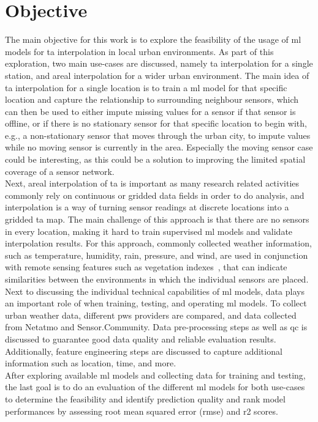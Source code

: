\section{Objective}

The main objective for this work is to explore the feasibility of the usage of \gls{ml} models for \gls{ta} interpolation in local urban environments. As part of this exploration, two main use-cases are discussed, namely \gls{ta} interpolation for a single station, and areal interpolation for a wider urban environment. The main idea of \gls{ta} interpolation for a single location is to train a \gls{ml} model for that specific location and capture the relationship to surrounding neighbour sensors, which can then be used to either impute missing values for a sensor if that sensor is offline, or if there is no stationary sensor for that specific location to begin with, e.g., a non-stationary sensor that moves through the urban city, to impute values while no moving sensor is currently in the area. Especially the moving sensor case could be interesting, as this could be a solution to improving the limited spatial coverage of a sensor network.\\
Next, areal interpolation of \gls{ta} is important as many research related activities commonly rely on continuous or gridded data fields in order to do analysis, and interpolation is a way of turning sensor readings at discrete locations into a gridded \gls{ta} map. The main challenge of this approach is that there are no sensors in every location, making it hard to train supervised \gls{ml} models and validate interpolation results. For this approach, commonly collected weather information, such as temperature, humidity, rain, pressure, and wind, are used in conjunction with remote sensing features such as vegetation indexes~\cite{alonso2020new}, that can indicate similarities between the environments in which the individual sensors are placed.\\
Next to discussing the individual technical capabilities of \gls{ml} models, data plays an important role of when training, testing, and operating \gls{ml} models. To collect urban weather data, different \gls{pws} providers are compared, and data collected from Netatmo and Sensor.Community. Data pre-processing steps as well as \gls{qc} is discussed to guarantee good data quality and reliable evaluation results. Additionally, feature engineering steps are discussed to capture additional information such as location, time, and more.\\
After exploring available \gls{ml} models and collecting data for training and testing, the last goal is to do an evaluation of the different \gls{ml} models for both use-cases to determine the feasibility and identify prediction quality and rank model performances by assessing root mean squared error (\gls{rmse}) and \gls{r2} scores.

